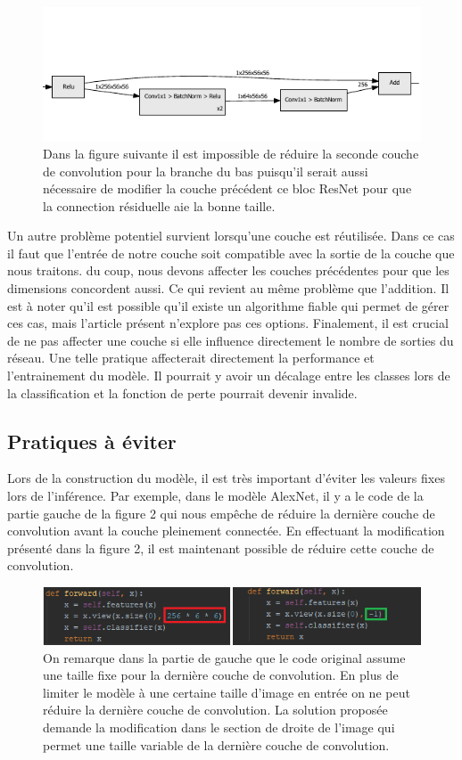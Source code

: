 \documentclass[12pt]{article}
\begin{document}
\begin{figure}[H]
	\centering
	\includegraphics{residual_add}
	\caption{Dans la figure suivante il est impossible de réduire la seconde couche de convolution pour la branche du bas puisqu'il serait aussi nécessaire de modifier la couche précédent ce bloc ResNet pour que la connection résiduelle aie la bonne taille.}
	\label{fig:residualadd}
\end{figure}

Un autre problème potentiel survient lorsqu'une couche est réutilisée. Dans ce cas il faut que l'entrée de notre couche soit compatible avec la sortie de la couche que nous traitons. du coup, nous devons affecter les couches précédentes pour que les dimensions concordent aussi. Ce qui revient au même problème que l'addition.
\newpage
Il est à noter qu'il est possible qu'il existe un algorithme fiable qui permet de gérer ces cas, mais l'article présent n'explore pas ces options.
Finalement, il est crucial de ne pas affecter une couche si elle influence directement le nombre de sorties du réseau. Une telle pratique affecterait directement la performance et l'entrainement du modèle. Il pourrait y avoir un décalage entre les classes lors de la classification et la fonction de perte pourrait devenir invalide.

\subsection{Pratiques à éviter}
Lors de la construction du modèle, il est très important d’éviter les valeurs fixes lors de l’inférence. Par exemple, dans le modèle AlexNet, il y a le code de la partie gauche de la figure 2 qui nous empêche de réduire la dernière couche de convolution avant la couche pleinement connectée. En effectuant la modification présenté dans la figure 2, il est maintenant possible de réduire cette couche de convolution. 
\begin{figure}[H]
	\centering
	\includegraphics{mistake}
	\caption{On remarque dans la partie de gauche que le code original assume une taille fixe pour la dernière couche de convolution. En plus de limiter le modèle à une certaine taille d'image en entrée on ne peut réduire la dernière couche de convolution. La solution proposée demande la modification dans le section de droite de l'image qui permet une taille variable de la dernière couche de convolution.}
	\label{fig:mistake}
\end{figure}
\end{document}
